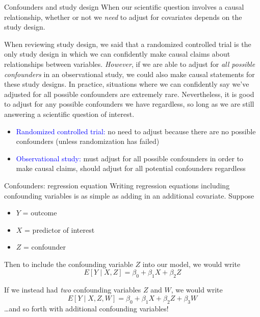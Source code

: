 \documentclass[10pt,t]{beamer}
\begin{document}
\begin{frame}{Confounders and study design}
When our scientific question involves a causal relationship, whether or not we \textit{need} to adjust for covariates depends on the study design.

\vspace{0.3cm}

When reviewing study design, we said that a randomized controlled trial is the only study design in which we can confidently make causal claims about relationships between variables. \textit{However}, if we are able to adjust for \textit{all possible confounders} in an observational study, we could also make causal statements for these study designs. In practice, situations where we can confidently say we've adjusted for all possible confounders are extremely rare. Nevertheless, it is good to adjust for any possible confounders we have regardless, so long as we are still answering a scientific question of interest. \pause

\vspace{0.3cm}

\begin{itemize}
	\item \textcolor{blue}{Randomized controlled trial:} no need to adjust because there are no possible confounders (unless randomization has failed)
	\item \textcolor{blue}{Observational study:} must adjust for all possible confounders in order to make causal claims, should adjust for all potential confounders regardless
\end{itemize}
\end{frame}

\begin{frame}{Confounders: regression equation}
Writing regression equations including confounding variables is as simple as adding in an additional covariate. Suppose

\vspace{0.3cm}

\begin{itemize}
	\item $Y$ = outcome
	\item $X$ = predictor of interest
	\item $Z$ = confounder
\end{itemize}

\vspace{0.3cm}

Then to include the confounding variable $Z$ into our model, we would write
$$
E[Y \mid X, Z] = \beta_0 + \beta_1 X + \beta_2 Z
$$

If we instead had \textit{two} confounding variables $Z$ and $W$, we would write
$$
E[Y \mid X, Z, W] = \beta_0 + \beta_1 X + \beta_2 Z + \beta_3 W
$$
\dots and so forth with additional confounding variables!

\end{frame}
\end{document}

